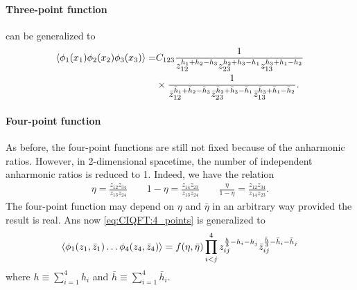 \documentclass[10pt]{article}
\begin{document}
\paragraph{Three-point function}
 can be generalized to
\begin{align}
    \expval{\phi_1(x_1)\phi_2(x_2)\phi_3(x_3)}= & C_{123}\frac{1}{z_{12}^{h_1+h_2-h_3}z_{23}^{h_2+h_3-h_1}z_{13}^{h_3+h_1-h_2}}\notag                                                                                           \\
                                                & \times\frac{1}{\bar{z}_{12}^{\bar{h}_1+\bar{h}_2-\bar{h}_3}\bar{z}_{23}^{\bar{h}_2+\bar{h}_3-\bar{h}_1}\bar{z}_{13}^{\bar{h}_3+\bar{h}_1-\bar{h}_2}}.\label{eq:2dcft:3_point}
\end{align}
\paragraph{Four-point function}
As before, the four-point functions are still not fixed because of the anharmonic ratios.
However, in 2-dimensional spacetime, the number of independent anharmonic ratios is reduced to 1.
Indeed, we have the relation
\begin{align}
    \eta=\frac{z_{12}z_{34}}{z_{13}z_{24}}\quad\quad1-\eta=\frac{z_{14}z_{23}}{z_{13}z_{24}}\quad\quad\frac{\eta}{1-\eta}=\frac{z_{12}z_{34}}{z_{14}z_{23}}.
\end{align}
The four-point function may depend on $\eta$ and $\bar{\eta}$ in an arbitrary way provided the result is real.
Ans now \cref{eq:CIQFT:4_points} is generalized to
\begin{align}\label{eq:2dcft:4_point}
    \expval{\phi_1(z_1,\bar{z}_1)\dots\phi_4(z_4,\bar{z}_4)}=f(\eta,\bar{\eta})\prod_{i<j}^4 z_{ij}^{\frac{h}{3}-h_i-h_j}\bar{z}_{ij}^{\frac{\bar{h}}{3}-\bar{h}_i-\bar{h}_j}
\end{align}
where $h\equiv\sum_{i=1}^4 h_i$ and $\bar{h}\equiv\sum_{i=1}^4\bar{h}_i$.
\end{document}
